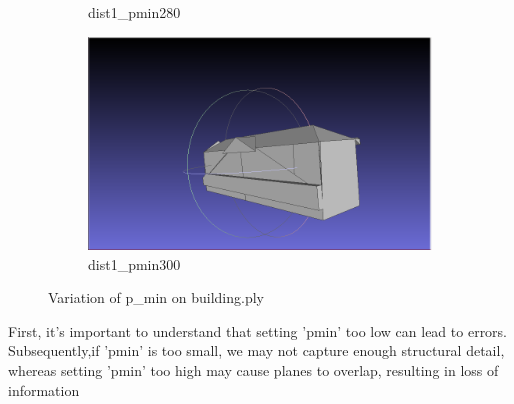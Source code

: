 \documentclass{article}
\begin{document}
\begin{figure}[H]
\begin{subfigure}[b]{0.45\textwidth}
    \caption{dist1\_pmin280}
    \label{fig:dist1_pmin280}
  \end{subfigure}
  \hfill
  \begin{subfigure}[b]{0.45\textwidth}
    \includegraphics[width=\textwidth]{../../images/screen_kinetic/dist1_pmin300.png}
    \caption{dist1\_pmin300}
    \label{fig:dist1_pmin300}
  \end{subfigure}
  \caption{Variation of p\_min on building.ply}
  \label{fig:ensemble_images}
\end{figure}
  
  First, it's important to understand that setting 'pmin' too low can lead to errors. Subsequently,if 'pmin' is too small, we may not capture enough structural detail,
  whereas setting 'pmin' too high may cause planes to overlap, resulting in loss of information
\end{document}
